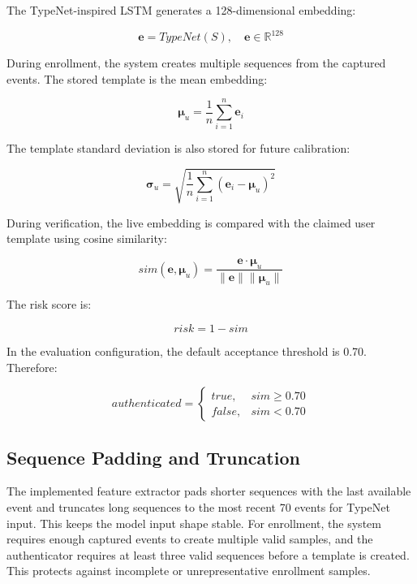 The TypeNet-inspired LSTM generates a 128-dimensional embedding:

\begin{equation}
\mathbf{e} = TypeNet(S), \quad \mathbf{e} \in \mathbb{R}^{128}
\end{equation}

During enrollment, the system creates multiple sequences from the captured events. The stored template is the mean embedding:

\begin{equation}
\boldsymbol{\mu}_u = \frac{1}{n}\sum_{i=1}^{n}\mathbf{e}_i
\end{equation}

The template standard deviation is also stored for future calibration:

\begin{equation}
\boldsymbol{\sigma}_u = \sqrt{\frac{1}{n}\sum_{i=1}^{n}(\mathbf{e}_i-\boldsymbol{\mu}_u)^2}
\end{equation}

During verification, the live embedding is compared with the claimed user template using cosine similarity:

\begin{equation}
sim(\mathbf{e}, \boldsymbol{\mu}_u)=
\frac{\mathbf{e}\cdot\boldsymbol{\mu}_u}{\|\mathbf{e}\|\|\boldsymbol{\mu}_u\|}
\end{equation}

The risk score is:

\begin{equation}
risk = 1 - sim
\end{equation}

In the evaluation configuration, the default acceptance threshold is 0.70. Therefore:

\begin{equation}
authenticated =
\begin{cases}
true, & sim \geq 0.70 \\
false, & sim < 0.70
\end{cases}
\end{equation}

\subsection{Sequence Padding and Truncation}
\label{subsec:padding-truncation}

The implemented feature extractor pads shorter sequences with the last available event and truncates long sequences to the most recent 70 events for TypeNet input. This keeps the model input shape stable. For enrollment, the system requires enough captured events to create multiple valid samples, and the authenticator requires at least three valid sequences before a template is created. This protects against incomplete or unrepresentative enrollment samples.

